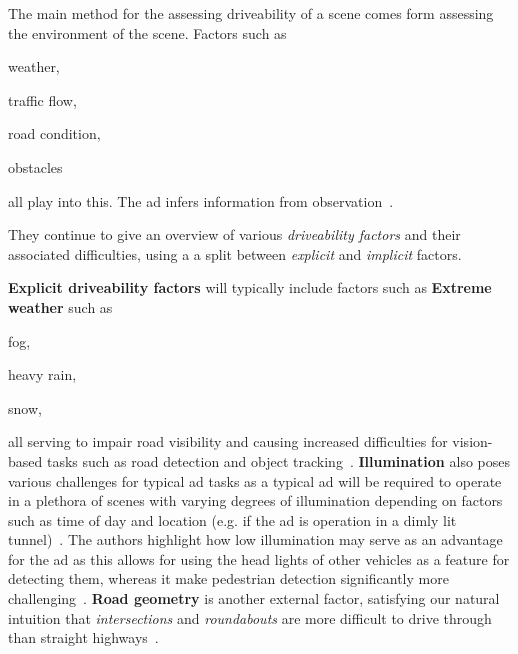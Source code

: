 The main method for the assessing driveability of a scene comes form assessing the environment
of the scene. Factors such as \begin{inparaenum}
    \item weather,
    \item traffic flow,
    \item road condition,
    \item obstacles
\end{inparaenum} all play into this. The \acrshort{ad} infers information from
observation~\cite[3136]{safeToDrive}.

They continue to give an overview of various \textit{driveability factors} and
their associated difficulties, using a a split between \textit{explicit} and
\textit{implicit} factors.

\textbf{Explicit driveability factors} will typically include factors such as
\textbf{Extreme weather} such as \begin{inparaenum}
    \item fog,
    \item heavy rain,
    \item snow,
\end{inparaenum}
all serving to impair road visibility and causing increased difficulties for
vision-based tasks such as road detection and object
tracking~\cite[3136-3137]{safeToDrive}. \textbf{Illumination} also poses
various challenges for typical \acrshort{ad} tasks as a typical \acrshort{ad}
will be required to operate in a plethora of scenes with varying degrees of
illumination depending on factors such as time of day and location (e.g. if the
\acrshort{ad} is operation in a dimly lit tunnel)~\cite[3137]{safeToDrive}. The
authors highlight how low illumination may serve as an advantage for the
\acrshort{ad} as this allows for using the head lights of other vehicles as a
feature for detecting them, whereas it make pedestrian detection significantly
more challenging~\cite[3137]{safeToDrive}. \textbf{Road geometry} is another
external factor, satisfying our natural intuition that \textit{intersections}
and \textit{roundabouts} are more difficult to drive through than straight
highways~\cite[3137]{safeToDrive}.

